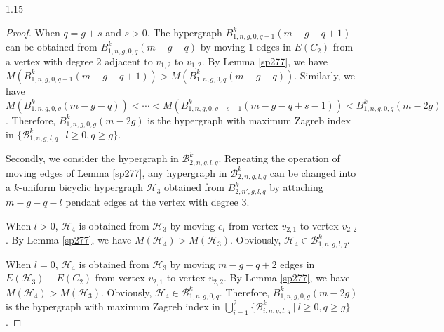 \documentclass[preprint,12pt]{elsarticle1}
\numberwithin{equation}{section}
\begin{document}
\begin{spacing}{1.15}
\begin{proof}
When $q=g+s$ and $s>0$. The hypergraph
$B_{1,n,g,0,q-1}^{k}(m-g-q+1)$ can be obtained from $B_{1,n,g,0,q}^{k}(m-g-q)$ by moving 1 edges in $E(C_{2})$
from a vertex with degree $2$ adjacent to $v_{1,2}$ to $v_{1,2}$. By Lemma \ref{sp277}, we have $M(B_{1,n,g,0,q-1}^{k}(m-g-q+1))>M(B_{1,n,g,0,q}^{k}(m-g-q))$.
Similarly, we have $M(B_{1,n,g,0,q}^{k}(m-g-q))<\cdots<M(B_{1,n,g,0,q-s+1}^{k}(m-g-q+s-1))<B_{1,n,g,0,g}^{k}(m-2g)$.
Therefore, $B_{1,n,g,0,g}^{k}(m-2g)$ is the hypergraph with maximum Zagreb index in $\{\mathcal{B}_{1,n,g,l,q}^{k}~|~l\geq0,q\geq g\}$.

Secondly, we consider the hypergraph in $\mathcal{B}_{2,n,g,l,q}^{k}$.
Repeating the operation of moving edges of Lemma \ref{sp277}, any hypergraph in $\mathcal{B}_{2,n,g,l,q}^{k}$ can be changed into a $k$-uniform bicyclic hypergraph $\mathcal{H}_{3}$
obtained from $B_{2,n',g,l,q}^{k}$ by attaching $m-g-q-l$ pendant edges at the vertex with degree 3.

When $l>0$, $\mathcal{H}_{4}$ is obtained from $\mathcal{H}_{3}$ by moving $e_{l}$
from vertex $v_{2,1}$ to vertex $v_{2,2}$. By Lemma \ref{sp277}, we have $M(\mathcal{H}_{4})>M(\mathcal{H}_{3})$. Obviously, $\mathcal{H}_{4}\in \mathcal{B}_{1,n,g,l,q}^{k}.$

When $l=0$, $\mathcal{H}_{4}$ is obtained from $\mathcal{H}_{3}$ by moving $m-g-q+2$ edges in $E(\mathcal{H}_{3})-E(C_{2})$
from vertex $v_{2,1}$ to vertex $v_{2,2}$. By Lemma \ref{sp277}, we have $M(\mathcal{H}_{4})>M(\mathcal{H}_{3})$. Obviously, $\mathcal{H}_{4}\in \mathcal{B}_{1,n,g,0,q}^{k}.$
Therefore, $B_{1,n,g,0,g}^{k}(m-2g)$ is the hypergraph with maximum Zagreb index in $\bigcup_{i=1}^{2}\{\mathcal{B}_{i,n,g,l,q}^{k}~|~l\geq0,q\geq g\}$.


\end{proof}
\end{spacing}
\end{document}
